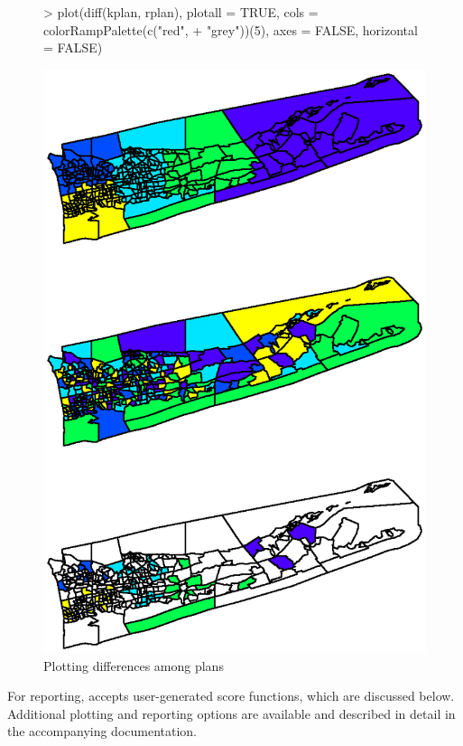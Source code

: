 \documentclass[article]{JSSstyle/jss}
\begin{document}
  \begin{figure}[!h]
  
\begin{Schunk}
\begin{Sinput}
> plot(diff(kplan, rplan), plotall = TRUE, cols = colorRampPalette(c("red", 
+     "grey"))(5), axes = FALSE, horizontal = FALSE)
\end{Sinput}
\end{Schunk}
\includegraphics{bardJSS-plot2a}
  \caption{\label{fig:rplot2} Plotting differences among plans}
  \end{figure}
  
For reporting,  accepts user-generated score functions, which are discussed below. Additional plotting and reporting options are available and described in detail in the accompanying documentation.  
\end{document}
